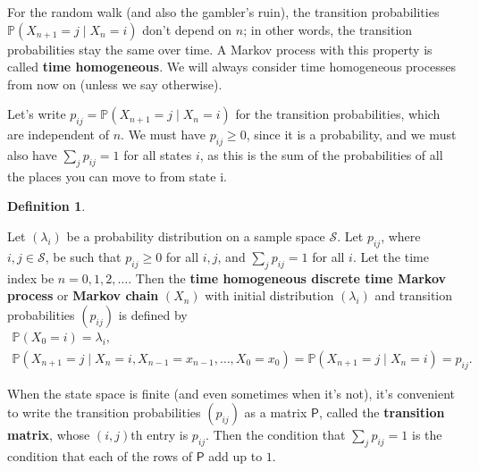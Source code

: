 \documentclass[
  a4paper,
]{article}
\theoremstyle{definition}
\newtheorem{definition}{Definition}[section]
\theoremstyle{definition}
\theoremstyle{definition}
\theoremstyle{remark}
\begin{document}
For the random walk (and also the gambler's ruin), the transition probabilities \(\mathbb P(X_{n+1} = j \mid X_n = i)\) don't depend on \(n\); in other words, the transition probabilities stay the same over time. A Markov process with this property is called \textbf{time homogeneous}. We will always consider time homogeneous processes from now on (unless we say otherwise).

Let's write \(p_{ij} = \mathbb P(X_{n+1} = j \mid X_n = i)\) for the transition probabilities, which are independent of \(n\).
We must have \(p_{ij} \geq 0\), since it is a probability, and we must also have \(\sum_j p_{ij} = 1\) for all states \(i\), as this is the sum of the probabilities of all the places you can move to from state i.

\begin{definition}
\protect\hypertarget{def:def-thmc}{}\label{def:def-thmc}

Let \((\lambda_i)\) be a probability distribution on a sample space \(\mathcal S\). Let \(p_{ij}\), where \(i,j \in \mathcal S\), be such that \(p_{ij} \geq 0\) for all \(i,j\), and \(\sum_j p_{ij} = 1\) for all \(i\). Let the time index be \(n = 0,1,2,\dots\). Then the \textbf{time homogeneous discrete time Markov process} or \textbf{Markov chain} \((X_n)\) with initial distribution \((\lambda_i)\) and transition probabilities \((p_{ij})\) is defined by
\begin{gather*}
    \mathbb P(X_0 = i) = \lambda_i ,\\
    \mathbb P(X_{n+1} = j \mid X_n = i, X_{n-1} = x_{n-1}, \dots, X_0 = x_0) = \mathbb P(X_{n+1} = j \mid X_n = i) =  p_{ij}  . \end{gather*}

\end{definition}

When the state space is finite (and even sometimes when it's not), it's convenient to write the transition probabilities \((p_{ij})\) as a matrix \(\mathsf P\), called the \textbf{transition matrix}, whose \((i,j)\)th entry is \(p_{ij}\). Then the condition that \(\sum_j p_{ij} = 1\) is the condition that each of the rows of \(\mathsf P\) add up to \(1\).
\end{document}
